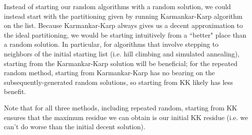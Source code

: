 \documentclass[a4paper]{article}
\begin{document}
	Instead of starting our random algorithms with a random solution, we could instead start with the partitioning given by running Karmankar-Karp algorithm on the list. Because Karmankar-Karp always gives us a decent approximation to the ideal partitioning, we would be starting intuitively from a ``better" place than a random solution. In particular, for algorithms that involve stepping to neighbors of the initial starting list (i.e. hill climbing and simulated annealing), starting from the Karmankar-Karp solution will be beneficial; for the repeated random method, starting from Karmankar-Karp has no bearing on the subsequently-generated random solutions, so starting from KK likely has less benefit.
	
	Note that for all three methods, including repeated random, starting from KK ensures that the maximum residue we can obtain is our initial KK residue (i.e. we can't do worse than the initial decent solution).
	
\end{document}

